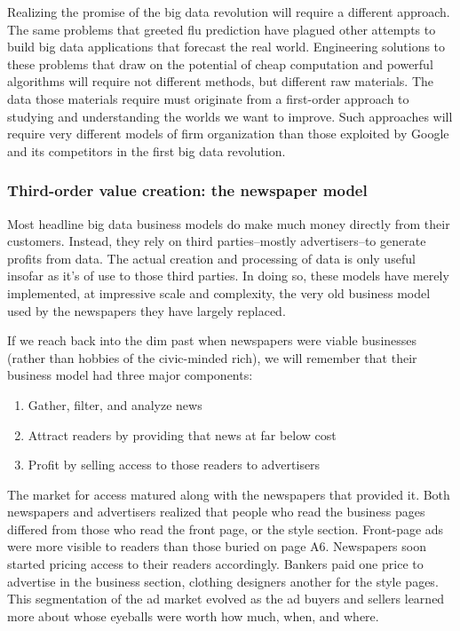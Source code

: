 \documentclass[12pt]{article}
\begin{document}
Realizing the promise of the big data revolution will require
a different approach. The same problems that greeted flu prediction
have plagued other attempts to build big data applications that
forecast the real world. Engineering solutions to these problems that
draw on the potential of cheap computation and powerful algorithms
will require not different methods, but different raw materials. The
data those materials require must originate from a first-order
approach to studying and understanding the worlds we want to
improve. Such approaches will require very different models of firm
organization than those exploited by Google and its competitors in the
first big data revolution.


\subsubsection{Third-order value creation: the newspaper model}
\label{sec:third-order-value}

Most headline big data business models do make much money directly from
their customers. Instead, they rely on third parties--mostly
advertisers--to generate profits from data. The actual creation and
processing of data is only useful insofar as it's of use to those
third parties. In doing so, these models have merely implemented, at
impressive scale and complexity, the very old business model used by
the newspapers they have largely replaced.

If we reach back into the dim past when newspapers were viable
businesses (rather than hobbies of the civic-minded rich), we will
remember that their business model had three major components:

\begin{enumerate}
\item Gather, filter, and analyze news
\item Attract readers by providing that news at far below cost
\item Profit by selling access to those readers to advertisers
\end{enumerate}

The market for access matured along with the newspapers that provided
it. Both newspapers and advertisers realized that people who read the business
pages differed from those who read the front page, or the style
section. Front-page ads were more visible to readers than those buried
on page A6. Newspapers soon started pricing access to their readers
accordingly. Bankers paid one price to advertise in the business
section, clothing designers another for the style pages. This
segmentation of the ad market evolved as the ad buyers and sellers
learned more about whose eyeballs were worth how much, when, and
where.
\end{document}
